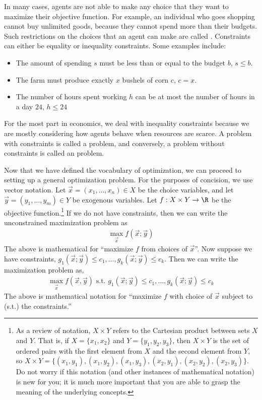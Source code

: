 In many cases, agents are not able to make any choice that they want to maximize their objective function. For example, an individual who goes shopping cannot buy unlimited goods, because they cannot spend more than their budgets. Such restrictions on the choices that an agent can make are called . Constraints can either be equality or inequality constraints. Some examples include:
\begin{itemize}
    \item The amount of spending $s$ must be less than or equal to the budget $b$, $s \leq b$.
    \item The farm must produce exactly $x$ bushels of corn $c$, $c = x$.
    \item The number of hours spent working $h$ can be at most the number of hours in a day $24$, $h \leq 24$
\end{itemize}
For the most part in economics, we deal with inequality constraints because we are mostly considering how agents behave when resources are scarce. A problem with constraints is called a  problem, and conversely, a problem without constraints is called an  problem.

Now that we have defined the vocabulary of optimization, we can proceed to setting up a general optimization problem. For the purposes of concision, we use vector notation. Let $\vec{x} = (x_1, \dots, x_n) \in X$ be the choice variables, and let $\vec{y} = (y_1, \dots, y_m) \in Y$ be exogenous variables. Let $f: X \times Y \to \R$ be the objective function.\footnote{As a review of notation, $X\times Y$ refers to the Cartesian product between sets $X$ and $Y$. That is, if $X = \{x_1, x_2\}$ and $Y = \{y_1, y_2, y_3\}$, then $X\times Y$ is the set of ordered pairs with the first element from $X$ and the second element from $Y$, so $X\times Y = \{(x_1, y_1), (x_1, y_2), (x_1, y_3), (x_2, y_1), (x_2, y_2), (x_2, y_3)\}.$ Do not worry if this notation (and other instances of mathematical notation) is new for you; it is much more important that you are able to grasp the meaning of the underlying concepts.} If we do not have constraints, then we can write the unconstrained maximization problem as
\begin{align*}
    \max_{\vec{x}} f(\vec{x}; \vec{y})
\end{align*}
The above is mathematical for ``maximize $f$ from choices of $\vec{x}$''. Now suppose we have constraints, $g_1(\vec{x}; \vec{y}) \leq c_1, \dots, g_k(\vec{x}; \vec{y}) \leq c_k$. Then we can write the maximization problem as,
\begin{align*}
    \max_{\vec{x}} f(\vec{x}, \vec{y}) \text{ s.t. } g_1(\vec{x}; \vec{y}) \leq c_1, \dots, g_k(\vec{x}; \vec{y}) \leq c_k
\end{align*}
The above is mathematical notation for ``maximize $f$ with choice of $\vec{x}$ subject to (s.t.) the constraints.'' 

